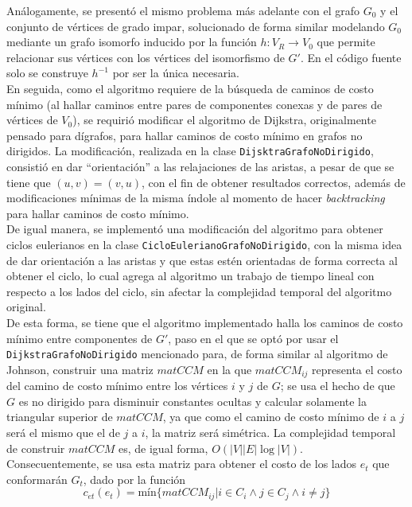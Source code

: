 \documentclass[11pt]{article}
\begin{document}
Análogamente, se presentó el mismo problema más adelante
con el grafo $G_0$ y el conjunto de vértices de grado impar,
solucionado de forma similar modelando $G_0$ mediante un grafo
isomorfo inducido por la función $h: V_R \rightarrow V_0 $ que
permite relacionar sus vértices con los vértices del isomorfismo
de $G'$. En el código fuente solo se construye $ h^{-1} $ por ser
la única necesaria. \\

En seguida, como el algoritmo requiere de la búsqueda de 
caminos de costo mínimo (al hallar caminos entre pares de componentes
conexas y de pares de vértices de $V_0$), se requirió modificar
el algoritmo de Dijkstra, originalmente pensado para dígrafos,
para hallar caminos de costo mínimo en grafos no dirigidos. 
La modificación, realizada en la clase \texttt{DijsktraGrafoNoDirigido},
consistió en dar ``orientación'' a las relajaciones de las aristas,
a pesar de que se tiene que $(u, v) = (v, u)$, con el fin de obtener
resultados correctos, además de modificaciones mínimas de la
misma índole al momento de hacer \emph{backtracking} para hallar
caminos de costo mínimo. \\

De igual manera, se implementó una modificación del algoritmo para
obtener ciclos eulerianos en la clase \texttt{CicloEulerianoGrafoNoDirigido},
con la misma idea de dar orientación a las aristas y que estas estén
orientadas de forma correcta al obtener el ciclo, lo cual agrega al
algoritmo un trabajo de tiempo lineal con respecto a los lados del
ciclo, sin afectar la complejidad temporal del algoritmo original. \\

De esta forma, se tiene que el algoritmo implementado halla los caminos
de costo mínimo entre componentes de $G'$, paso en el que se optó por usar
el \texttt{DijkstraGrafoNoDirigido} mencionado para, de forma similar
al algoritmo de Johnson, construir una matriz $matCCM$ en la que $matCCM_{ij}$
representa el costo del camino de costo mínimo entre los vértices $i$ y $j$ de
$G$; se usa el hecho de que $G$ es no dirigido para disminuir constantes ocultas
y calcular solamente la triangular superior de $matCCM$, ya que como el camino de 
costo mínimo de $i$ a $j$ será el mismo que el de $j$ a $i$, la matriz será simétrica.
La complejidad temporal de construir $matCCM$ es, de igual forma, $O(|V||E|\log|V|)$. \\ 

Consecuentemente, se usa esta matriz para obtener el costo de los lados $e_t$ que
conformarán $G_t$, dado por la función
\[
   c_{et}(e_t) = \text{mín}\{matCCM_{ij} | i \in C_i \land j \in C_j \land i \neq j \}
\]
\end{document}
